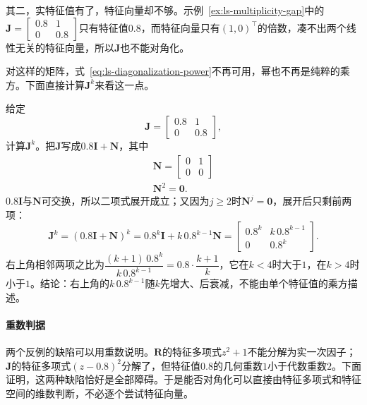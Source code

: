 其二，实特征值有了，特征向量却不够。示例~\ref{ex:ls-multiplicity-gap}中的$\bm J=\left[\begin{smallmatrix}0.8&1\\0&0.8\end{smallmatrix}\right]$只有特征值$0.8$，而特征向量只有$(1,0)^{\top}$的倍数，凑不出两个线性无关的特征向量，所以$\bm J$也不能对角化。

对这样的矩阵，式~\eqref{eq:ls-diagonalization-power}不再可用，幂也不再是纯粹的乘方。下面直接计算$\bm J^k$来看这一点。
\begin{example}[不能对角化矩阵的幂]
\label{ex:ls-jordan-block-power}
给定
\[
 \bm J=\begin{bmatrix}0.8&1\\0&0.8\end{bmatrix},
\]
计算$\bm J^k$。把$\bm J$写成$0.8\bm I+\bm N$，其中
\[
\begin{gathered}
\bm N=\begin{bmatrix}0&1\\0&0\end{bmatrix}\\
\bm N^2=\bm0 .
\end{gathered}
\]
$0.8\bm I$与$\bm N$可交换，所以二项式展开成立；又因为$j\geq2$时$\bm N^j=\bm0$，展开后只剩前两项：
\[
 \bm J^k=(0.8\bm I+\bm N)^k=0.8^k\bm I+k\,0.8^{k-1}\bm N=\begin{bmatrix}0.8^k&k\,0.8^{k-1}\\0&0.8^k\end{bmatrix}.
\]
右上角相邻两项之比为$\dfrac{(k+1)\,0.8^{k}}{k\,0.8^{k-1}}=0.8\cdot\dfrac{k+1}{k}$，它在$k<4$时大于$1$，在$k>4$时小于$1$。结论：右上角的$k\,0.8^{k-1}$随$k$先增大、后衰减，不能由单个特征值的乘方描述。
\end{example}

\paragraph{重数判据}
两个反例的缺陷可以用重数说明。$\bm R$的特征多项式$z^2+1$不能分解为实一次因子；$\bm J$的特征多项式$(z-0.8)^2$分解了，但特征值$0.8$的几何重数$1$小于代数重数$2$。下面证明，这两种缺陷恰好是全部障碍。于是能否对角化可以直接由特征多项式和特征空间的维数判断，不必逐个尝试特征向量。

